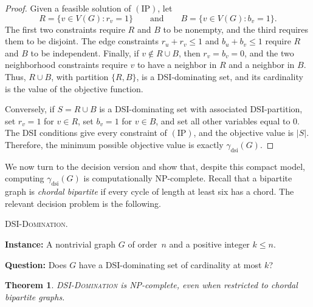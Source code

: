 \documentclass[11pt]{article}
\newtheorem{theorem}{Theorem}
\theoremstyle{definition}
\theoremstyle{remark}
\newcommand{\dsi}{\mathrm{dsi}}
\begin{document}
\begin{proof}
Given a feasible solution of \((\mathrm{IP})\), let
\[
   R=\{v\in V(G): r_v=1\}
   \qquad\text{and}\qquad
   B=\{v\in V(G): b_v=1\}.
\]
The first two constraints require \(R\) and \(B\) to be nonempty, and the
third requires them to be disjoint. The edge constraints
\(r_u+r_v\le 1\) and \(b_u+b_v\le 1\) require \(R\) and \(B\) to be
independent. Finally, if \(v\notin R\cup B\), then \(r_v=b_v=0\), and the
two neighborhood constraints require \(v\) to have a neighbor in \(R\) and a
neighbor in \(B\). Thus, \(R\cup B\), with partition \(\{R,B\}\), is a
DSI-dominating set, and its cardinality is the value of the objective
function.

Conversely, if \(S=R\cup B\) is a DSI-dominating set with associated
DSI-partition, set \(r_v=1\) for \(v\in R\), set \(b_v=1\) for \(v\in B\),
and set all other variables equal to \(0\). The DSI conditions give every
constraint of \((\mathrm{IP})\), and the objective value is \(|S|\).
Therefore, the minimum possible objective value is exactly
\(\gamma_{\dsi}(G)\).
\end{proof}


We now turn to the decision version and show that, despite this compact
model, computing \(\gamma_{\dsi}(G)\) is computationally NP-complete.  Recall that a bipartite graph is \emph{chordal bipartite} if
every cycle of length at least six has a chord. The relevant decision problem
is the following.

\noindent\textsc{DSI-Domination}.

\textbf{Instance:} A nontrivial graph \(G\) of order~$n$ and a positive integer \(k\le
n\).

\textbf{Question:} Does \(G\) have a DSI-dominating set of cardinality at
most \(k\)?

\begin{theorem}
\label{thm:dsi-np-complete}
\textnormal{\textsc{DSI-Domination}} is NP-complete, even when restricted to
chordal bipartite graphs.
\end{theorem}
\end{document}
